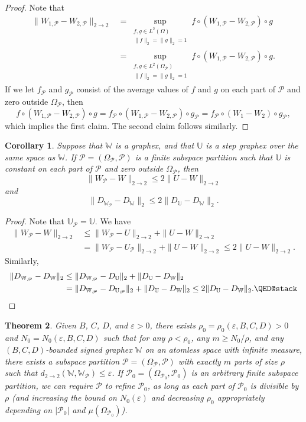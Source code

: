 \documentclass{amsart}
\numberwithin{equation}{section}
\numberwithin{figure}{section}
\newtheorem{theorem}{Theorem}[section]
\newtheorem{corollary}[theorem]{Corollary}
\theoremstyle{definition}
\theoremstyle{remark}
\newcommand{\eps}{\varepsilon}
\newcommand{\cP}{\mathcal{P}}
\newcommand{\cW}{\mathbb{W}}
\newcommand{\cU}{\mathbb{U}}
\newcommand{\sP}{\mathscr{P}}
\def\d22{d_{2\to 2}}
\begin{document}
\begin{proof}
Note that
\begin{align*}
\|W_{1,\sP}-W_{2,\sP}\|_{2 \rightarrow 2}&=\sup_{\substack{f,g \in L^2(\Omega)\\ \|f\|_2=\|g\|_2=1}}
f \circ (W_{1,\sP}-W_{2,\sP}) \circ g\\
&=\sup_{\substack{f,g \in L^2(\Omega_\sP)\\ \|f\|_2=\|g\|_2=1}} f \circ (W_{1,\sP}-W_{2,\sP}) \circ
g.
\end{align*}
If we let $f_\sP$ and $g_\sP$ consist of the average values of $f$ and $g$ on
each part of $\cP$ and zero outside $\Omega_\sP$, then
\[f \circ (W_{1,\sP}-W_{2,\sP}) \circ g=f_\sP \circ (W_{1,\sP}-W_{2,\sP}) \circ g_\sP=f_\sP \circ (W_{1}-W_{2}) \circ g_\sP,
\]
which implies the first claim. The second claim follows similarly.
\end{proof}

\begin{corollary}\label{corrolarystepvsaverage}
Suppose that $\cW$ is a graphex, and that $\cU$ is a step graphex over the
same space as $\cW$. If $\sP=(\Omega_\sP,\cP)$ is a finite subspace partition
such that $\cU$ is constant on each part of $\cP$ and zero outside
$\Omega_\sP$, then
\[\|W_\sP-W\|_{2 \rightarrow 2} \le 2\|U-W\|_{2 \rightarrow 2}
\]
and
\[\|D_{\cW_\sP}-D_\cW\|_2 \le 2\|D_\cU-D_\cW\|_2.
\]
\end{corollary}

\begin{proof}
Note that $\cU_{\sP}=\cU$. We have
\begin{align*}
\|W_\sP-W\|_{2 \rightarrow 2} &\le \|W_\sP-U\|_{2 \rightarrow 2} +\|U-W\|_{2 \rightarrow 2}\\
&= \|W_\sP-U_\sP\|_{2 \rightarrow 2} +\|U-W\|_{2 \rightarrow 2}
\le 2\|U-W\|_{2 \rightarrow
2}.
\end{align*}
Similarly,
\begin{align*}
\|D_{\cW_\sP}-D_\cW\|_2 &\le\|D_{\cW_\sP}-D_\cU\|_2+\|D_{\cU}-D_\cW\|_2\\
&=\|D_{\cW_\sP}-D_{\cU_\sP}\|_2+\|D_{\cU}-D_\cW\|_2
\le
2\|D_\cU-D_\cW\|_2
. \qedhere
\end{align*}
\end{proof}

\begin{theorem} \label{regularityequalparts}
Given $B$, $C$, $D$, and $\varepsilon>0$, there exists
$\rho_0=\rho_0(\varepsilon,B,C,D)>0$ and $N_0=N_0(\varepsilon,B,C,D)$ such
that for any $\rho<\rho_0$, any $m \ge N_0/\rho$, and any $(B,C,D)$-bounded
signed graphex $\cW$ on an atomless space with infinite measure, there exists
a subspace partition $\sP=(\Omega_\sP,\cP)$ with exactly $m$ parts of size
$\rho$ such that $\d22(\cW,\cW_\sP)\leq \eps$. If
$\sP_0=(\Omega_{\sP_0},\cP_0)$ is an arbitrary finite subspace partition, we
can require $\sP$ to refine $\sP_0$, as long as each part of $\cP_0$ is
divisible by $\rho$ (and increasing the bound on $N_0(\varepsilon)$ and
decreasing $\rho_0$ appropriately depending on $|\cP_0|$ and
$\mu(\Omega_{\sP_0})$).
\end{theorem}
\end{document}
